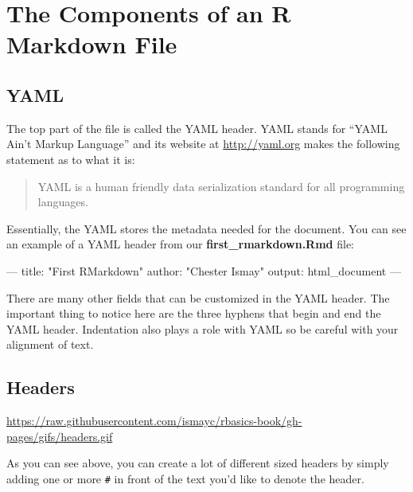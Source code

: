 \documentclass[]{tufte-book}
\newenvironment{Shaded}{\begin{snugshade}}{\end{snugshade}}
\newcommand{\StringTok}[1]{\textcolor[rgb]{0.31,0.60,0.02}{{#1}}}
\newcommand{\OtherTok}[1]{\textcolor[rgb]{0.56,0.35,0.01}{{#1}}}
\newcommand{\FunctionTok}[1]{\textcolor[rgb]{0.00,0.00,0.00}{{#1}}}
\newcommand{\NormalTok}[1]{{#1}}
\begin{document}
\section{The Components of an R Markdown
File}\label{the-components-of-an-r-markdown-file}

\subsection{YAML}\label{yaml}

The top part of the file is called the YAML header. YAML stands for
``YAML Ain't Markup Language'' and its website at \url{http://yaml.org}
makes the following statement as to what it is:

\begin{quote}
YAML is a human friendly data serialization standard for all programming
languages.
\end{quote}

Essentially, the YAML stores the metadata needed for the document. You
can see an example of a YAML header from our
\textbf{first\_rmarkdown.Rmd} file:

\begin{Shaded}
\begin{Highlighting}[]
\OtherTok{---}
\FunctionTok{title:} \StringTok{"First RMarkdown"}
\FunctionTok{author:} \StringTok{"Chester Ismay"}
\FunctionTok{output:} \NormalTok{html_document}
\OtherTok{---}
\end{Highlighting}
\end{Shaded}

There are many other fields that can be customized in the YAML header.
The important thing to notice here are the three hyphens that begin and
end the YAML header. Indentation also plays a role with YAML so be
careful with your alignment of text.

\subsection{Headers}\label{headers}

\vspace{0.1in}

\begin{center}\footnotesize{\url{https://raw.githubusercontent.com/ismayc/rbasics-book/gh-pages/gifs/headers.gif}}\end{center}

\vspace{0.1in}

As you can see above, you can create a lot of different sized headers by
simply adding one or more \texttt{\#} in front of the text you'd like to
denote the header.
\end{document}
